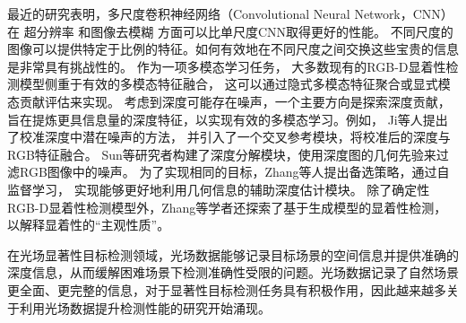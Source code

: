 



最近的研究表明，多尺度卷积神经网络（Convolutional Neural Network，CNN）在
超分辨率
和图像去模糊
方面可以比单尺度CNN取得更好的性能。
不同尺度的图像可以提供特定于比例的特征。如何有效地在不同尺度之间交换这些宝贵的信息是非常具有挑战性的。
作为一项多模态学习任务，
大多数现有的RGB-D显着性检测模型侧重于有效的多模态特征融合，
这可以通过隐式多模态特征聚合或显式模态贡献评估来实现。
考虑到深度可能存在噪声，一个主要方向是探索深度贡献，
旨在提炼更具信息量的深度特征，以实现有效的多模态学习。例如，
Ji等人提出了校准深度中潜在噪声的方法，
并引入了一个交叉参考模块，将校准后的深度与RGB特征融合。
Sun等研究者构建了深度分解模块，使用深度图的几何先验来过滤RGB图像中的噪声。
为了实现相同的目标，Zhang等人提出备选策略，通过自监督学习，
实现能够更好地利用几何信息的辅助深度估计模块。
除了确定性RGB-D显着性检测模型外，Zhang等学者还探索了基于生成模型的显着性检测，
以解释显着性的“主观性质”。











\label{chpt1:title:lf_methods}


在光场显著性目标检测领域，光场数据能够记录目标场景的空间信息并提供准确的深度信息，从而缓解困难场景下检测准确性受限的问题。光场数据记录了自然场景更全面、更完整的信息，对于显著性目标检测任务具有积极作用，因此越来越多关于利用光场数据提升检测性能的研究开始涌现。



